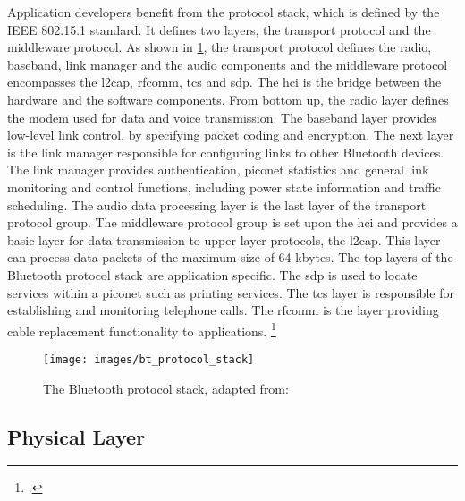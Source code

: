 Application developers benefit from the protocol stack, which is defined by the IEEE 802.15.1 standard. It defines two layers, the transport protocol and the middleware protocol. As shown in \cref{fig:bt_protocol_stack}, the transport protocol defines the radio, baseband, link manager and the audio components and the middleware protocol encompasses the \gls{l2cap}, \gls{rfcomm}, \gls{tcs} and \gls{sdp}. The \gls{hci} is the bridge between the hardware and the software components. From bottom up, the radio layer defines the modem used for data and voice transmission. The baseband layer provides low-level link control, by specifying packet coding and encryption. The next layer is the link manager responsible for configuring links to other Bluetooth devices. The link manager provides authentication, piconet statistics and general link monitoring and control functions, including power state information and traffic scheduling. The audio data processing layer is the last layer of the transport protocol group. The middleware protocol group is set upon the \gls{hci} and provides a basic layer for data transmission to upper layer protocols, the \gls{l2cap}. This layer can process data packets of the maximum size of 64 kbytes. The top layers of the Bluetooth protocol stack are application specific. The \gls{sdp} is used to locate services within a piconet such as printing services. The \gls{tcs} layer is responsible for establishing and monitoring telephone calls. The \gls{rfcomm} is the layer providing cable replacement functionality to applications. \footcite[Cf.][448]{Pahlavan2009}

\begin{figure}[ht]
  \centering
  \texttt{[image: images/bt\_protocol\_stack]}
  \caption{The Bluetooth protocol stack, adapted from: \cite[448]{Pahlavan2009}}
  \label{fig:bt_protocol_stack}
\end{figure}

\subsection{Physical Layer}

